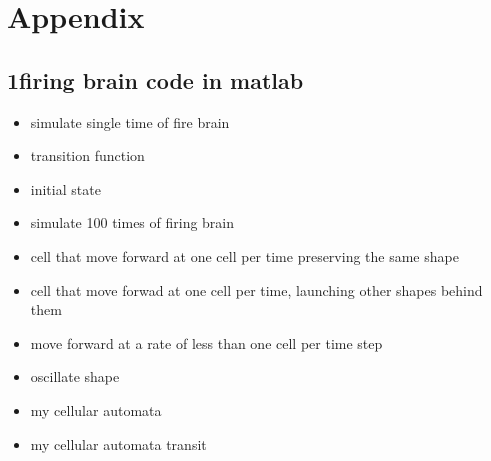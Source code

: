 \documentclass[12pt]{article}
\begin{document}
\newpage
\section{Appendix}

\subsection{1firing brain code in matlab}
\singlespacing
\begin{itemize}
\item {\large simulate single time of fire brain}

\vspace{1cm}

\item {\large transition function}

\vspace{1cm}

\item {\large initial state}

\vspace{1cm}

\item {\large simulate 100 times of firing brain}

\vspace{1cm}

\item {\large cell that move forward at one cell per time preserving the same shape}

\vspace{1cm}

\item {\large cell that move forwad at one cell per time, launching other shapes behind them}

\vspace{1cm}

\item {\large move forward at a rate of less than one cell per time step}

\vspace{1cm}

\item {\large oscillate shape}

\vspace{1cm}


\item {\large my cellular automata}

\vspace{1cm}

\item {\large my cellular automata transit}

\vspace{1cm}


\end{itemize}
\end{document}
